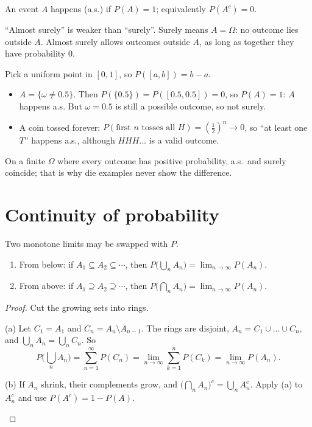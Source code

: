 \begin{definition}
An event $A$ happens  (a.s.) if $P(A)=1$; equivalently $P(A^c)=0$.
\end{definition}

``Almost surely'' is weaker than ``surely''. Surely means $A=\Omega$: no outcome lies outside $A$. Almost surely allows outcomes outside $A$, as long as together they have probability $0$.

\begin{example}
Pick a uniform point in $[0,1]$, so $P([a,b])=b-a$.
\begin{itemize}
  \item $A=\{\omega\ne0.5\}$. Then $P(\{0.5\})=P([0.5,0.5])=0$, so $P(A)=1$: $A$ happens a.s. But $\omega=0.5$ is still a possible outcome, so not surely.
  \item A coin tossed forever: $P(\text{first $n$ tosses all $H$})=(\frac12)^n\to0$, so ``at least one $T$'' happens a.s., although $HHH\ldots$ is a valid outcome.
\end{itemize}
On a finite $\Omega$ where every outcome has positive probability, a.s.\ and surely coincide; that is why die examples never show the difference.
\end{example}

\section{Continuity of probability}

\begin{theorem}[Continuity of $P$]
\label{thm:continuity}
Two monotone limits may be swapped with $P$.
\begin{enumerate}[label=(\alph*)]
  \item From below: if $A_1\subseteq A_2\subseteq\cdots$, then $P\big(\bigcup_n A_n\big)=\lim_{n\to\infty}P(A_n)$.
  \item From above: if $A_1\supseteq A_2\supseteq\cdots$, then $P\big(\bigcap_n A_n\big)=\lim_{n\to\infty}P(A_n)$.
\end{enumerate}
\end{theorem}
\begin{proof}
Cut the growing sets into rings.
\begin{steps}
  \item (a) Let $C_1=A_1$ and $C_n=A_n\setminus A_{n-1}$. The rings are disjoint, $A_n=C_1\cup\dots\cup C_n$, and $\bigcup_n A_n=\bigcup_n C_n$. So
  \[
    P\Big(\bigcup_n A_n\Big)=\sum_{n=1}^\infty P(C_n)=\lim_{n\to\infty}\sum_{k=1}^n P(C_k)=\lim_{n\to\infty}P(A_n).
  \]
  \item (b) If $A_n$ shrink, their complements grow, and $\big(\bigcap_n A_n\big)^c=\bigcup_n A_n^c$. Apply (a) to $A_n^c$ and use $P(A^c)=1-P(A)$. \qedhere
\end{steps}
\end{proof}

